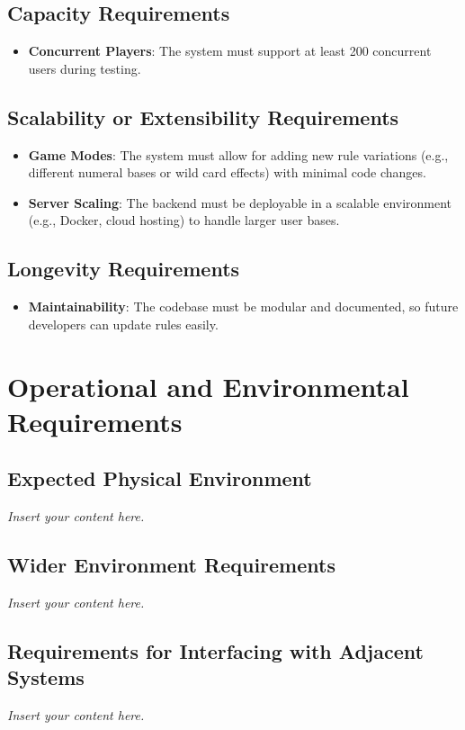 \documentclass[12pt]{article}
\newcommand{\lips}{\textit{Insert your content here.}}
\begin{document}
\subsection{Capacity Requirements}
	\begin{itemize}
		\item\textbf{Concurrent Players}: The system must support at least 200 concurrent users during testing.
	\end{itemize}

\subsection{Scalability or Extensibility Requirements}
	\begin{itemize}
		\item\textbf{Game Modes}: The system must allow for adding new rule variations (e.g., different numeral bases or wild card effects) with minimal code changes.
		\item \textbf{Server Scaling}: The backend must be deployable in a scalable environment (e.g., Docker, cloud hosting) to handle larger user bases.
	\end{itemize}

\subsection{Longevity Requirements}
	\begin{itemize}
		\item\textbf{Maintainability}: The codebase must be modular and documented, so future developers can update rules easily.
	\end{itemize}


\section{Operational and Environmental Requirements}
\subsection{Expected Physical Environment}
\lips
\subsection{Wider Environment Requirements}
\lips
\subsection{Requirements for Interfacing with Adjacent Systems}
\lips
\end{document}
